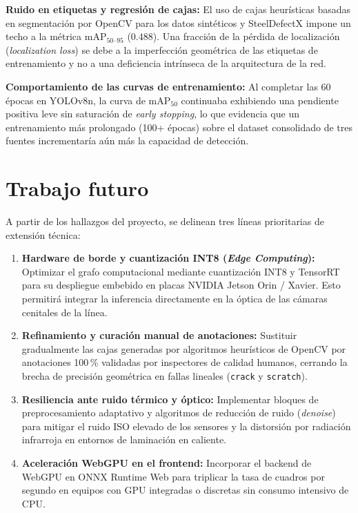\documentclass[11pt,a4paper]{article}
\begin{document}
\textbf{Ruido en etiquetas y regresión de cajas:} El uso de cajas heurísticas basadas
en segmentación por OpenCV para los datos sintéticos y SteelDefectX impone un techo a la
métrica $\text{mAP}_{50\text{--}95}$ ($0.488$). Una fracción de la pérdida de
localización (\emph{localization loss}) se debe a la imperfección geométrica de las
etiquetas de entrenamiento y no a una deficiencia intrínseca de la arquitectura de la red.

\textbf{Comportamiento de las curvas de entrenamiento:} Al completar las 60 épocas en
YOLOv8n, la curva de $\text{mAP}_{50}$ continuaba exhibiendo una pendiente positiva leve
sin saturación de \emph{early stopping}, lo que evidencia que un entrenamiento más
prolongado (100+ épocas) sobre el dataset consolidado de tres fuentes incrementaría aún
más la capacidad de detección.

\section{Trabajo futuro}

A partir de los hallazgos del proyecto, se delinean tres líneas prioritarias de
extensión técnica:

\begin{enumerate}[leftmargin=1.6em,itemsep=0.2em]
  \item \textbf{Hardware de borde y cuantización INT8 (\emph{Edge Computing}):}
  Optimizar el grafo computacional mediante cuantización INT8 y TensorRT para su
  despliegue embebido en placas NVIDIA Jetson Orin / Xavier. Esto permitirá integrar
  la inferencia directamente en la óptica de las cámaras cenitales de la línea.
  \item \textbf{Refinamiento y curación manual de anotaciones:} Sustituir gradualmente
  las cajas generadas por algoritmos heurísticos de OpenCV por anotaciones 100\,\%
  validadas por inspectores de calidad humanos, cerrando la brecha de precisión
  geométrica en fallas lineales (\texttt{crack} y \texttt{scratch}).
  \item \textbf{Resiliencia ante ruido térmico y óptico:} Implementar bloques de
  preprocesamiento adaptativo y algoritmos de reducción de ruido (\emph{denoise}) para
  mitigar el ruido ISO elevado de los sensores y la distorsión por radiación infrarroja
  en entornos de laminación en caliente.
  \item \textbf{Aceleración WebGPU en el frontend:} Incorporar el backend de WebGPU en
  ONNX Runtime Web para triplicar la tasa de cuadros por segundo en equipos con GPU
  integradas o discretas sin consumo intensivo de CPU.
\end{enumerate}
\end{document}
